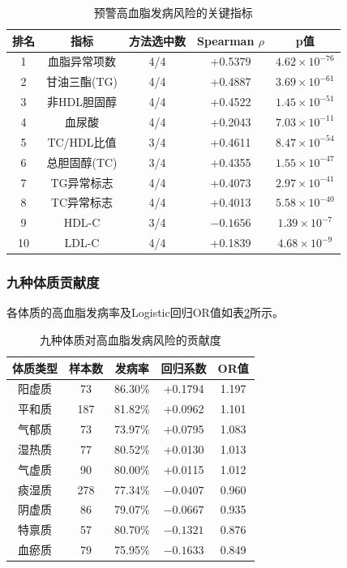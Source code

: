 \documentclass[12pt,a4paper]{ctexart}
\begin{document}
\begin{table}[H]
\centering
\begin{tabular}{ccccc}
\toprule
\textbf{排名} & \textbf{指标} & \textbf{方法选中数} & \textbf{Spearman $\rho$} & \textbf{p值} \\
\midrule
1 & 血脂异常项数 & 4/4 & +0.5379 & $4.62\times 10^{-76}$ \\
2 & 甘油三酯(TG) & 4/4 & +0.4887 & $3.69\times 10^{-61}$ \\
3 & 非HDL胆固醇 & 4/4 & +0.4522 & $1.45\times 10^{-51}$ \\
4 & 血尿酸 & 4/4 & +0.2043 & $7.03\times 10^{-11}$ \\
5 & TC/HDL比值 & 3/4 & +0.4611 & $8.47\times 10^{-54}$ \\
6 & 总胆固醇(TC) & 3/4 & +0.4355 & $1.55\times 10^{-47}$ \\
7 & TG异常标志 & 4/4 & +0.4073 & $2.97\times 10^{-41}$ \\
8 & TC异常标志 & 4/4 & +0.4013 & $5.58\times 10^{-40}$ \\
9 & HDL-C & 3/4 & $-0.1656$ & $1.39\times 10^{-7}$ \\
10 & LDL-C & 4/4 & +0.1839 & $4.68\times 10^{-9}$ \\
\bottomrule
\end{tabular}
\caption{预警高血脂发病风险的关键指标}
\label{tab:hyper_features}
\end{table}

\subsubsection{九种体质贡献度}

各体质的高血脂发病率及Logistic回归OR值如表\ref{tab:constitution}所示。

\begin{table}[H]
\centering
\begin{tabular}{ccccc}
\toprule
\textbf{体质类型} & \textbf{样本数} & \textbf{发病率} & \textbf{回归系数} & \textbf{OR值} \\
\midrule
阳虚质 & 73 & 86.30\% & +0.1794 & 1.197 \\
平和质 & 187 & 81.82\% & +0.0962 & 1.101 \\
气郁质 & 73 & 73.97\% & +0.0795 & 1.083 \\
湿热质 & 77 & 80.52\% & +0.0130 & 1.013 \\
气虚质 & 90 & 80.00\% & +0.0115 & 1.012 \\
痰湿质 & 278 & 77.34\% & $-0.0407$ & 0.960 \\
阴虚质 & 86 & 79.07\% & $-0.0667$ & 0.935 \\
特禀质 & 57 & 80.70\% & $-0.1321$ & 0.876 \\
血瘀质 & 79 & 75.95\% & $-0.1633$ & 0.849 \\
\bottomrule
\end{tabular}
\caption{九种体质对高血脂发病风险的贡献度}
\label{tab:constitution}
\end{table}
\end{document}
